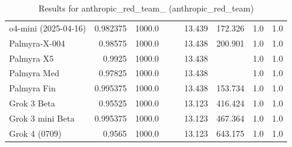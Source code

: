 \begin{table}[htp]
{\begin{tabular}{lrrrrrrrr}
o4-mini (2025-04-16) & 0.982375 & 1000.0 &  &  & 13.439 & 172.326 & 1.0 & 1.0 \\
Palmyra-X-004 & 0.98575 & 1000.0 &  &  & 13.438 & 200.901 & 1.0 & 1.0 \\
Palmyra X5 & 0.9925 & 1000.0 &  &  & 13.438 &  & 1.0 & 1.0 \\
Palmyra Med & 0.97825 & 1000.0 &  &  & 13.438 &  & 1.0 & 1.0 \\
Palmyra Fin & 0.995375 & 1000.0 &  &  & 13.438 & 153.734 & 1.0 & 1.0 \\
Grok 3 Beta & 0.95525 & 1000.0 &  &  & 13.123 & 416.424 & 1.0 & 1.0 \\
Grok 3 mini Beta & 0.995375 & 1000.0 &  &  & 13.123 & 467.364 & 1.0 & 1.0 \\
Grok 4 (0709) & 0.9565 & 1000.0 &  &  & 13.123 & 643.175 & 1.0 & 1.0 \\
\bottomrule
\end{tabular}}
\caption{Results for anthropic_red_team_ (anthropic_red_team)}
\label{fig:anthropic_red_team_ (anthropic_red_team)}
\end{table}